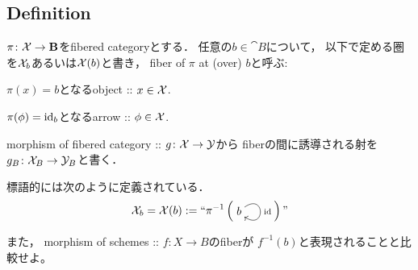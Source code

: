 \documentclass[a4paper, dvipdfmx]{jsarticle}
\begin{document}
\subsection{Definition}
\begin{Def}[Fiber]
    $\pi \colon \stX \to \cat{B}$をfibered categoryとする．
    任意の$b \in \cat{B}$について，
    以下で定める圏を$\stX_b$あるいは$\stX(b)$と書き，
    fiber of $\pi$ at (over) $b$と呼ぶ:
    \begin{description}[labelindent=1cm]
        \item[Object.] $\pi(x)=b$となるobject :: $x \in \stX$.
        \item[Arrow.] $\pi(\phi)=\id[b]$となるarrow :: $\phi \in \stX$.
    \end{description}

    morphism of fibered category :: $g \colon \stX \to \stY$から
    fiberの間に誘導される射を$g_B \colon \stX_B \to \stY_B$と書く．
\end{Def}
\begin{Remark}
    標語的には次のように定義されている．
    \[
        \stX_b=\stX(b):=``
        \pi^{-1} \left(
        \vcenter{\xymatrix{
            b \ar@(ur,dr)^-{\id}
        }}
        \right)"
    \]
    
    また，
    morphism of schemes :: $f \colon X \to B$のfiberが
    $f^{-1}(b)$と表現されることと比較せよ。
\end{Remark}
\end{document}
